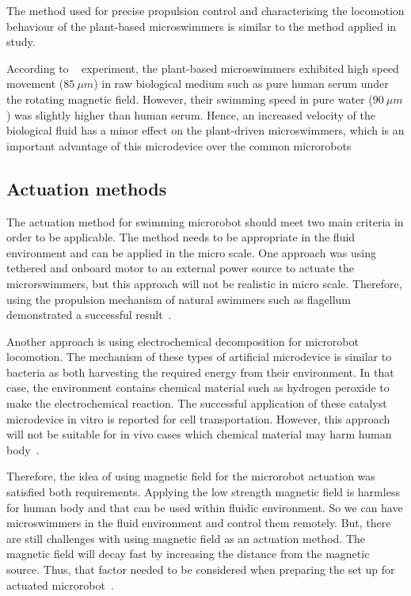 \documentclass[12pt,a4paper,titlepage]{report}
\newcommand{\hilight}[1]{\colorbox{yellow}{#1}}
\begin{document}
The method used for precise propulsion control and characterising the locomotion behaviour of the 
plant-based microswimmers is similar to the method applied in \citeauthor{gao2013bioinspired} study.

According to \citeauthor{gao2013bioinspired} ~\citep{gao2013bioinspired} experiment, the plant-based 
microswimmers exhibited high speed movement ($85~\mu m$) in raw biological medium such as 
pure human serum under the rotating magnetic field. However, their swimming speed in pure water
 ($90~\mu m$) was slightly higher than human serum.   
 Hence, an increased velocity of the 
biological fluid has a minor effect on the plant-driven microswimmers, which is an important 
advantage of this microdevice over the common microrobots%



\subsection{Actuation methods} \label{actuation}

The actuation method for swimming microrobot should meet two main criteria in order to be 
applicable. The method needs to be appropriate in the fluid environment and can be applied 
in the micro scale. One approach was using tethered and onboard motor to an external power
 source to actuate the microrswimmers, but this approach will not be realistic in micro scale. 
Therefore, using the propulsion mechanism of natural swimmers such as flagellum demonstrated 
a successful result~\citep{peyer2013bio}.

Another approach is using electrochemical decomposition for microrobot locomotion. 
The mechanism of these types of artificial microdevice is similar to bacteria as both harvesting the 
required energy from their environment. In that case, the environment contains chemical material such 
as hydrogen peroxide to make the electrochemical reaction. The successful application of these catalyst 
microdevice in vitro is reported for cell transportation. However, this approach will not be suitable for in vivo 
cases which chemical material may harm human body~\citep{peyer2013bio}.   

Therefore, the idea of using magnetic field for the microrobot actuation was satisfied both requirements. 
Applying the low strength magnetic field is harmless for human body and that can be used within fluidic 
environment. So we can have microswimmers in the fluid environment and control them remotely. But, 
there are still challenges with using magnetic field as an actuation method. The magnetic field will decay 
fast by increasing the distance from the magnetic source. Thus, that factor needed to be considered 
when preparing the set up for actuated microrobot~\citep{peyer2013bio}.   
\end{document}
